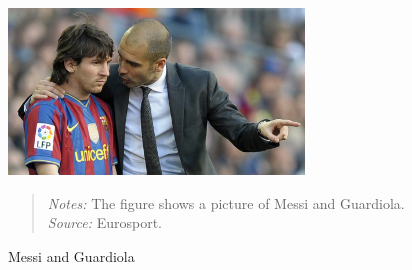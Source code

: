 \begin{figure}[ht!]
    \centering
    \includegraphics[width=0.7\textwidth]{graphics/messi_pep.jpg}
    \caption{Messi and Guardiola}
    \label{fig:messi_pep}
    \begin{quote}
        \textit{Notes:} 
        The figure shows a picture of Messi and Guardiola.
        \textit{Source:} Eurosport.
    \end{quote} 
\end{figure}
